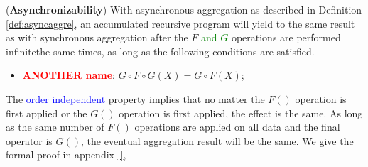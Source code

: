 {\begin{theorem}
	\label{th:async}
	(\textbf{Asynchronizability}) With asynchronous aggregation as described in Definition \ref{def:asyncaggre}, an accumulated recursive program will yield to the same result as with synchronous aggregation after the $F$ \textcolor{green}{and $G$} operations are performed {\color{green}infinite}the same times, as long as the following conditions are satisfied.
	\begin{itemize}
		\item \textbf{\textcolor{red}{ANOTHER name}}: $G\circ F\circ G(X)=G\circ F(X)$;
	\end{itemize}
\end{theorem}
The \textcolor{blue}{order independent} property implies that no matter the $F()$ operation is first applied or the $G()$ operation is first applied, the effect is the same. As long as the same number of $F()$ operations are applied on all data and the final operator is $G()$, the eventual aggregation result will be the same.%
We give the formal proof in appendix \ref{},
}
